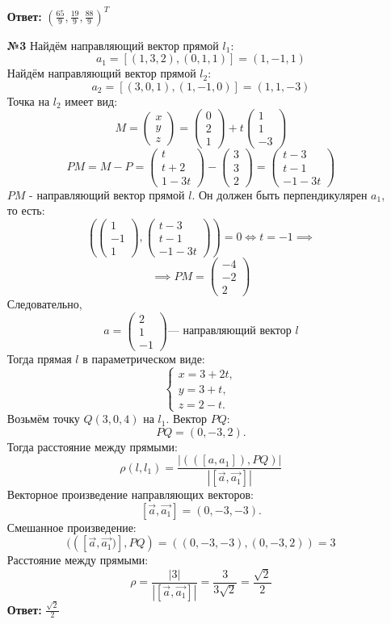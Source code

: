 \documentclass[a4paper]{article}
\newcommand{\mat}[1]{\begin{pmatrix} #1 \end{pmatrix}}
\newcommand{\lr}{\Leftrightarrow}
\renewcommand{\l}{\left(}
\renewcommand{\r}{\right)}
\begin{document}
\begin{enumerate}
    \textbf{Ответ: } $(\frac{65}{9}, \frac{19}{9}, \frac{88}{9})^T$\\

    \item[\textbf{№3}]Найдём направляющий вектор прямой $l_1$:
    $$a_1 = [(1 ,3, 2), (0, 1, 1)] = (1, -1, 1)$$
    Найдём направляющий вектор прямой $l_2$:
    $$a_2 = [(3, 0, 1), (1, -1, 0)] = (1, 1, -3)$$
    Точка на $l_2$ имеет вид:
    $$ M = \mat{x\\ y\\ z} = \begin{pmatrix} 0 \\ 2 \\ 1 \end{pmatrix} + t \begin{pmatrix} 1 \\ 1 \\ -3 \end{pmatrix}$$
    $$PM = M - P = \begin{pmatrix} t \\ t + 2 \\ 1 - 3t \end{pmatrix} - \mat{3\\3\\2} = \begin{pmatrix} t - 3 \\ t - 1 \\ -1 - 3t \end{pmatrix}$$
    $PM$ - направляющий вектор прямой $l$. Он должен быть перпендикулярен $a_1$, то есть:
    $$\l \mat{1\\-1\\1},  \begin{pmatrix} t - 3 \\ t - 1 \\ -1 - 3t \end{pmatrix}\r = 0 \lr t=-1 \implies$$
    $$\implies PM = \mat{-4\\-2\\2}$$
    Следовательно,
    $$a = \mat{2\\1\\-1} \text{--- направляющий вектор $l$}$$
    Тогда прямая \( l \) в параметрическом виде:  
    \[
    \begin{cases}
    x = 3 + 2t, \\
    y = 3 + t, \\
    z = 2 - t.
    \end{cases}
    \]
    Возьмём точку \( Q(3, 0, 4) \) на \( l_1 \). Вектор \( PQ \):
    \[
    PQ = (0, -3, 2).
    \]
    Тогда расстояние между прямыми:
    \[
    \rho(l, l_1) = \frac{\left| (\left( [a, a_1] \right) , PQ) \right|}{\left| [\vec{a} , \vec{a_1}] \right|}
    \]
    Векторное произведение направляющих векторов:
    \[
    [\vec{a}, \vec{a_1} ]= (0, -3, -3).
    \]   
    Смешанное произведение:
    \[
    (([\vec{a}, \vec{a_1})], PQ) = ((0, -3, -3), (0, -3, 2) )= 3
    \]
    Расстояние между прямыми:
    \[
    \rho = \frac{|3|}{|[\vec{a}, \vec{a_1}]|} = \frac{3}{3\sqrt{2}} = \frac{\sqrt{2}}{2}
    \]
    \textbf{Ответ: } $\frac{\sqrt{2}}{2}$\\


\end{enumerate}
\end{document}
